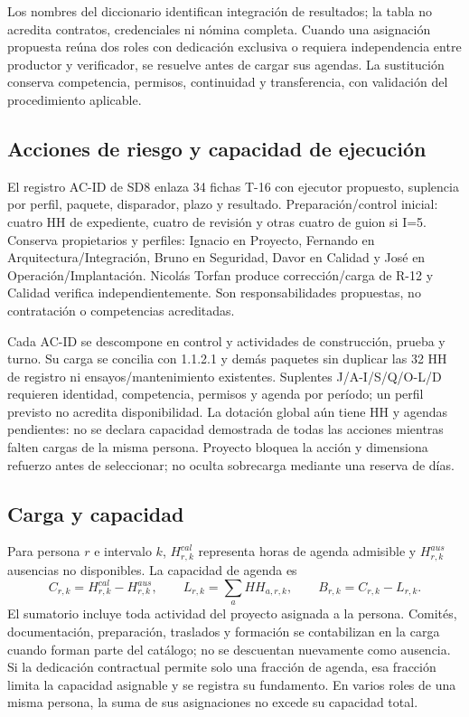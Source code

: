 Los nombres del diccionario identifican integración de resultados; la tabla no acredita contratos, credenciales ni nómina completa. Cuando una asignación propuesta reúna dos roles con dedicación exclusiva o requiera independencia entre productor y verificador, se resuelve antes de cargar sus agendas. La sustitución conserva competencia, permisos, continuidad y transferencia, con validación del procedimiento aplicable.

\subsection{Acciones de riesgo y capacidad de ejecución}
El registro AC-ID de SD8 enlaza 34 fichas T-16 con ejecutor propuesto, suplencia por perfil, paquete, disparador, plazo y resultado. Preparación/control inicial: cuatro HH de expediente, cuatro de revisión y otras cuatro de guion si I=5. Conserva propietarios y perfiles: Ignacio en Proyecto, Fernando en Arquitectura/Integración, Bruno en Seguridad, Davor en Calidad y José en Operación/Implantación. Nicolás Torfan produce corrección/carga de R-12 y Calidad verifica independientemente. Son responsabilidades propuestas, no contratación o competencias acreditadas.

Cada AC-ID se descompone en control y actividades de construcción, prueba y turno. Su carga se concilia con 1.1.2.1 y demás paquetes sin duplicar las 32 HH de registro ni ensayos/mantenimiento existentes. Suplentes J/A-I/S/Q/O-L/D requieren identidad, competencia, permisos y agenda por período; un perfil previsto no acredita disponibilidad. La dotación global aún tiene HH y agendas pendientes: no se declara capacidad demostrada de todas las acciones mientras falten cargas de la misma persona. Proyecto bloquea la acción y dimensiona refuerzo antes de seleccionar; no oculta sobrecarga mediante una reserva de días.


\subsection{Carga y capacidad}
Para persona $r$ e intervalo $k$, $H^{cal}_{r,k}$ representa horas de agenda admisible y $H^{aus}_{r,k}$ ausencias no disponibles. La capacidad de agenda es
\[
C_{r,k}=H^{cal}_{r,k}-H^{aus}_{r,k},\qquad
L_{r,k}=\sum_a HH_{a,r,k},\qquad B_{r,k}=C_{r,k}-L_{r,k}.
\]
El sumatorio incluye toda actividad del proyecto asignada a la persona. Comités, documentación, preparación, traslados y formación se contabilizan en la carga cuando forman parte del catálogo; no se descuentan nuevamente como ausencia. Si la dedicación contractual permite solo una fracción de agenda, esa fracción limita la capacidad asignable y se registra su fundamento. En varios roles de una misma persona, la suma de sus asignaciones no excede su capacidad total.

